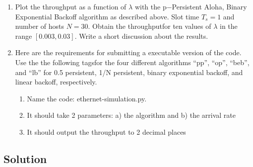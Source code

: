 \documentclass{article}
\begin{document}
\begin{enumerate}
    \item Plot  the  throughput  as  a  function  of $\lambda$ with  the p−Persistent  Aloha,  Binary  Exponential  Backoff algorithm as described above.
          Slot time $T_s= 1$ and number of hosts $N = 30$.
          Obtain the throughputfor ten values of $\lambda$ in the range $[0.003, 0.03]$.
          Write a short discussion about the results.
    \item Here are the requirements for submitting a executable version of the code.
          Use the the following tagsfor the four different algorithms ``pp'', ``op'', ``beb'', and ``lb'' for 0.5 persistent, 1/N persistent, binary exponential backoff, and linear backoff, respectively.
          \begin{enumerate}
              \item Name the code: ethernet-simulation.py.
              \item It should take 2 parameters: a) the algorithm and b) the arrival rate
              \item It should output the throughput to 2 decimal places
          \end{enumerate}

\end{enumerate}


\subsection*{Solution}

\begin{figure}[H]
    \centering
\end{figure}
\end{document}
